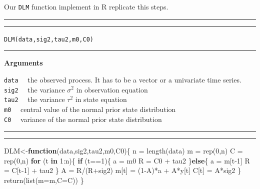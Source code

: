 \documentclass[
]{book}
\newenvironment{Shaded}{\begin{snugshade}}{\end{snugshade}}
\newcommand{\AttributeTok}[1]{\textcolor[rgb]{0.77,0.63,0.00}{#1}}
\newcommand{\ControlFlowTok}[1]{\textcolor[rgb]{0.13,0.29,0.53}{\textbf{#1}}}
\newcommand{\DecValTok}[1]{\textcolor[rgb]{0.00,0.00,0.81}{#1}}
\newcommand{\FunctionTok}[1]{\textcolor[rgb]{0.00,0.00,0.00}{#1}}
\newcommand{\NormalTok}[1]{#1}
\newcommand{\OtherTok}[1]{\textcolor[rgb]{0.56,0.35,0.01}{#1}}
\newcommand{\SpecialCharTok}[1]{\textcolor[rgb]{0.00,0.00,0.00}{#1}}
\theoremstyle{break}
\theoremstyle{nonumberplain}
\begin{document}
Our \texttt{DLM} function implement in R replicate this steps.\\

\hrule
\hrule

\hfill\break
\texttt{DLM(data,sig2,tau2,m0,C0)}\\

\hrule

\textbf{Arguments}

\texttt{data} ~~the observed process. It has to be a vector or a
univariate time series.\\
\texttt{sig2} ~~the variance \(\sigma^{2}\) in observation equation\\
\texttt{tau2} ~~the variance \(\tau^{2}\) in state equation\\
\texttt{m0} ~~central value of the normal prior state distribution\\
\texttt{C0} ~~variance of the normal prior state distribution

\hrule
\hrule

\begin{Shaded}
\begin{Highlighting}[]
\NormalTok{DLM}\OtherTok{\textless{}{-}}\ControlFlowTok{function}\NormalTok{(data,sig2,tau2,m0,C0)\{}
\NormalTok{  n  }\OtherTok{=} \FunctionTok{length}\NormalTok{(data)}
\NormalTok{  m  }\OtherTok{=} \FunctionTok{rep}\NormalTok{(}\DecValTok{0}\NormalTok{,n)}
\NormalTok{  C  }\OtherTok{=} \FunctionTok{rep}\NormalTok{(}\DecValTok{0}\NormalTok{,n)}
  \ControlFlowTok{for}\NormalTok{ (t }\ControlFlowTok{in} \DecValTok{1}\SpecialCharTok{:}\NormalTok{n)\{}
    \ControlFlowTok{if}\NormalTok{ (t}\SpecialCharTok{==}\DecValTok{1}\NormalTok{)\{}
\NormalTok{      a }\OtherTok{=}\NormalTok{ m0}
\NormalTok{      R }\OtherTok{=}\NormalTok{ C0 }\SpecialCharTok{+}\NormalTok{ tau2}
\NormalTok{    \}}\ControlFlowTok{else}\NormalTok{\{}
\NormalTok{      a }\OtherTok{=}\NormalTok{ m[t}\DecValTok{{-}1}\NormalTok{]}
\NormalTok{      R }\OtherTok{=}\NormalTok{ C[t}\DecValTok{{-}1}\NormalTok{] }\SpecialCharTok{+}\NormalTok{ tau2}
\NormalTok{    \}}
\NormalTok{    A }\OtherTok{=}\NormalTok{ R}\SpecialCharTok{/}\NormalTok{(R}\SpecialCharTok{+}\NormalTok{sig2)}
\NormalTok{    m[t] }\OtherTok{=}\NormalTok{ (}\DecValTok{1}\SpecialCharTok{{-}}\NormalTok{A)}\SpecialCharTok{*}\NormalTok{a }\SpecialCharTok{+}\NormalTok{ A}\SpecialCharTok{*}\NormalTok{y[t]}
\NormalTok{    C[t] }\OtherTok{=}\NormalTok{ A}\SpecialCharTok{*}\NormalTok{sig2}
\NormalTok{  \}}
  \FunctionTok{return}\NormalTok{(}\FunctionTok{list}\NormalTok{(}\AttributeTok{m=}\NormalTok{m,}\AttributeTok{C=}\NormalTok{C))}
\NormalTok{\}}
\end{Highlighting}
\end{Shaded}
\end{document}
